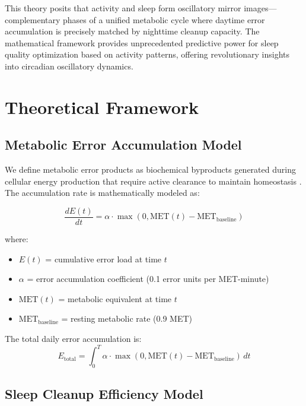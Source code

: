 \documentclass[12pt]{article}
\begin{document}
This theory posits that activity and sleep form oscillatory mirror images—complementary phases of a unified metabolic cycle where daytime error accumulation is precisely matched by nighttime cleanup capacity. The mathematical framework provides unprecedented predictive power for sleep quality optimization based on activity patterns, offering revolutionary insights into circadian oscillatory dynamics.

\section{Theoretical Framework}

\subsection{Metabolic Error Accumulation Model}

We define metabolic error products as biochemical byproducts generated during cellular energy production that require active clearance to maintain homeostasis \citep{xie2013sleep, nedergaard2013garbage}. The accumulation rate is mathematically modeled as:

\begin{equation}
\frac{dE(t)}{dt} = \alpha \cdot \max(0, \text{MET}(t) - \text{MET}_{\text{baseline}})
\label{eq:error_accumulation}
\end{equation}

where:
\begin{itemize}
\item $E(t)$ = cumulative error load at time $t$
\item $\alpha$ = error accumulation coefficient (0.1 error units per MET-minute)
\item $\text{MET}(t)$ = metabolic equivalent at time $t$
\item $\text{MET}_{\text{baseline}}$ = resting metabolic rate (0.9 MET)
\end{itemize}

The total daily error accumulation is:
\begin{equation}
E_{\text{total}} = \int_0^{T} \alpha \cdot \max(0, \text{MET}(t) - \text{MET}_{\text{baseline}}) \, dt
\label{eq:total_error}
\end{equation}

\subsection{Sleep Cleanup Efficiency Model}
\end{document}
